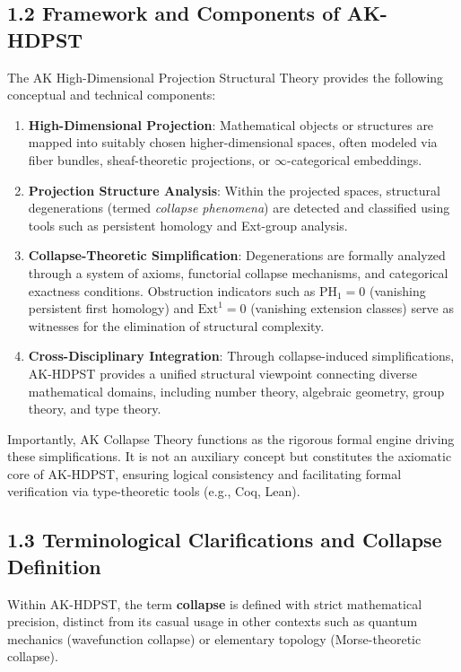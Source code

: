 \documentclass[11pt]{article}
\begin{document}
\subsection*{1.2 Framework and Components of AK-HDPST}

The AK High-Dimensional Projection Structural Theory provides the following conceptual and technical components:

\begin{enumerate}
    \item \textbf{High-Dimensional Projection}: Mathematical objects or structures are mapped into suitably chosen higher-dimensional spaces, often modeled via fiber bundles, sheaf-theoretic projections, or $\infty$-categorical embeddings.

    \item \textbf{Projection Structure Analysis}: Within the projected spaces, structural degenerations (termed \textit{collapse phenomena}) are detected and classified using tools such as persistent homology and Ext-group analysis.

    \item \textbf{Collapse-Theoretic Simplification}: Degenerations are formally analyzed through a system of axioms, functorial collapse mechanisms, and categorical exactness conditions. Obstruction indicators such as $\mathrm{PH}_1 = 0$ (vanishing persistent first homology) and $\mathrm{Ext}^1 = 0$ (vanishing extension classes) serve as witnesses for the elimination of structural complexity.

    \item \textbf{Cross-Disciplinary Integration}: Through collapse-induced simplifications, AK-HDPST provides a unified structural viewpoint connecting diverse mathematical domains, including number theory, algebraic geometry, group theory, and type theory.
\end{enumerate}

Importantly, AK Collapse Theory functions as the rigorous formal engine driving these simplifications. It is not an auxiliary concept but constitutes the axiomatic core of AK-HDPST, ensuring logical consistency and facilitating formal verification via type-theoretic tools (e.g., Coq, Lean).

\subsection*{1.3 Terminological Clarifications and Collapse Definition}

Within AK-HDPST, the term \textbf{collapse} is defined with strict mathematical precision, distinct from its casual usage in other contexts such as quantum mechanics (wavefunction collapse) or elementary topology (Morse-theoretic collapse).
\end{document}
